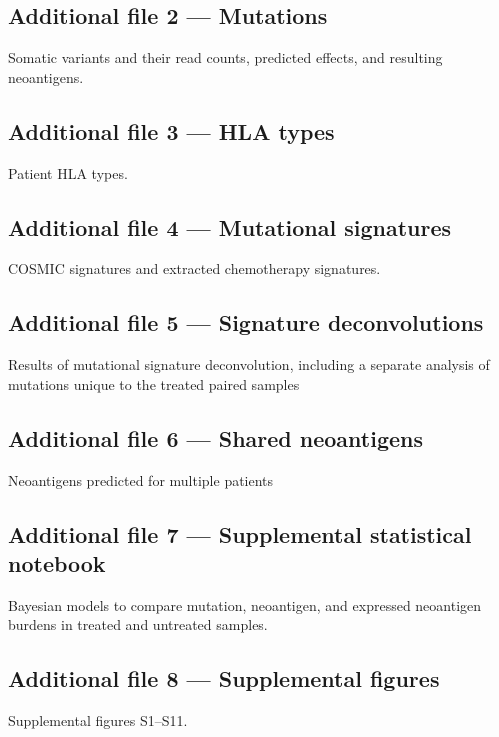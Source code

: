 \documentclass{bmcart}
\begin{document}
\begin{backmatter}
  \subsection*{Additional file 2 --- Mutations}
    Somatic variants and their read counts, predicted effects, and resulting neoantigens.
  
  \subsection*{Additional file 3 --- HLA types}
    Patient HLA types.
    
  \subsection*{Additional file 4 --- Mutational signatures}
    COSMIC signatures and extracted chemotherapy signatures.
    
  \subsection*{Additional file 5 --- Signature deconvolutions}
    Results of mutational signature deconvolution, including a separate analysis of mutations unique to the treated paired samples
    
  \subsection*{Additional file 6 --- Shared neoantigens}
    Neoantigens predicted for multiple patients
    
   \subsection*{Additional file 7 --- Supplemental statistical notebook}
    Bayesian models to compare mutation, neoantigen, and expressed neoantigen burdens in treated and untreated samples.
    
  \subsection*{Additional file 8 --- Supplemental figures}
    Supplemental figures S1--S11.
    
\end{backmatter}
\end{document}
